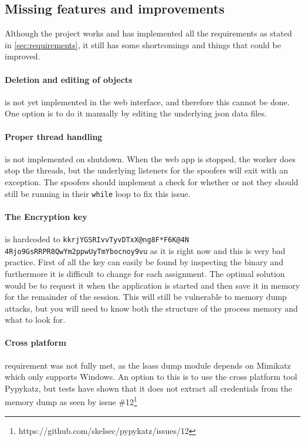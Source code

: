 \documentclass{article}
\begin{document}
\subsection{Missing features and improvements}
Although the project works and has implemented all the requirements as stated in \ref{sec:requirements}, it still has some shortcomings and things that could be improved.

\paragraph{Deletion and editing of objects} is not yet implemented in the web interface, and therefore this cannot be done. One option is to do it manually by editing the underlying \gls{json} data files.

\paragraph{Proper thread handling} is not implemented on shutdown. When the web app is stopped, the worker does stop the threads, but the underlying listeners for the spoofers will exit with an exception. The spoofers should implement a check for whether or not they should still be running in their \texttt{while} loop to fix this issue.

\paragraph{The Encryption key} is hardcoded to \texttt{kkrjYGSRIvvTyvDTxX@ng8F*F6K@4N 4Rjo9GsRRPR8QwYm2ppwUyTmYbocnoy9vu} as it is right now and this is very bad practice. First of all the key can easily be found by inspecting the binary and furthermore it is difficult to change for each assignment. The optimal solution would be to request it when the application is started and then save it in memory for the remainder of the session. This will still be vulnerable to memory dump attacks, but you will need to know both the structure of the process memory and what to look for.

\paragraph{Cross platform} requirement was not fully met, as the \gls{lsass} dump module depends on Mimikatz which only supports Windows. An option to this is to use the cross platform tool Pypykatz\cite{url:discussion:pypykatz}, but tests have shown that it does not extract all credentials from the memory dump as seen by issue \#12\footnote{https://github.com/skelsec/pypykatz/issues/12}
\end{document}
